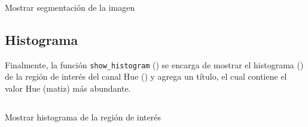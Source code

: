 \begin{listing}[H]
\inputminted{python}{code_listings/show_segmentation.py}
\caption{Mostrar segmentación de la imagen}
\label{code:show_segmentation}
\end{listing}

\subsection{Histograma}
Finalmente, la función \texttt{show\_histogram} () se encarga de mostrar el histograma () de la región de interés del canal Hue () y agrega un título, el cual contiene el valor Hue (matiz) más abundante.

\begin{listing}[H]
\inputminted{python}{code_listings/show_histogram.py}
\caption{Mostrar histograma de la región de interés}
\label{code:show_histogram}
\end{listing}